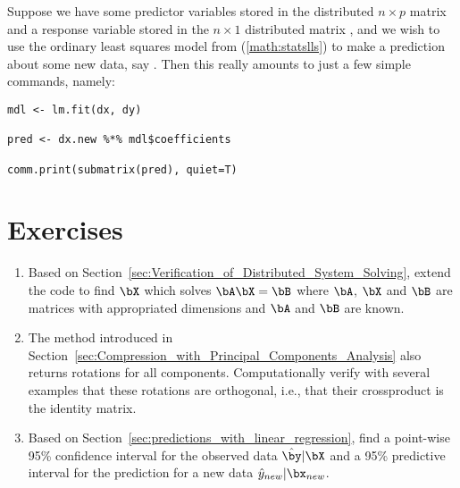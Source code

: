 Suppose we have some predictor variables stored in the distributed
$n\times p$ matrix  and a response variable stored
in the $n\times 1$ distributed matrix , and we wish to use the
ordinary least squares model from (\ref{math:statslls}) to make a
prediction about some new data, say . Then this really
amounts to just a few simple commands, namely:
\begin{lstlisting}[language=rr]
mdl <- lm.fit(dx, dy)

pred <- dx.new %*% mdl$coefficients

comm.print(submatrix(pred), quiet=T)
\end{lstlisting}




\section{Exercises}
\label{sec:pmclust_exercise}

\begin{enumerate}[label=\thechapter-\arabic*]

\item
Based on Section~\ref{sec:Verification_of_Distributed_System_Solving},
extend the code to find $\bX$ which solves $\bA\bX = \bB$ where $\bA$, $\bX$ 
and $\bB$ are matrices with appropriated dimensions and $\bA$ and $\bB$ are 
known.

\item
The  method introduced in 
Section~\ref{sec:Compression_with_Principal_Components_Analysis}
also returns rotations for all components.  Computationally verify with 
several examples that these rotations are orthogonal, i.e., that their 
crossproduct is the identity matrix.

\item
Based on Section~\ref{sec:predictions_with_linear_regression}, find a point-wise
95\% confidence interval for the observed data $\hat{\by}|\bX$ and a 95\% 
predictive interval for the prediction for a new data $\hat{y}_{new}|\bx_{new}$.

\end{enumerate}